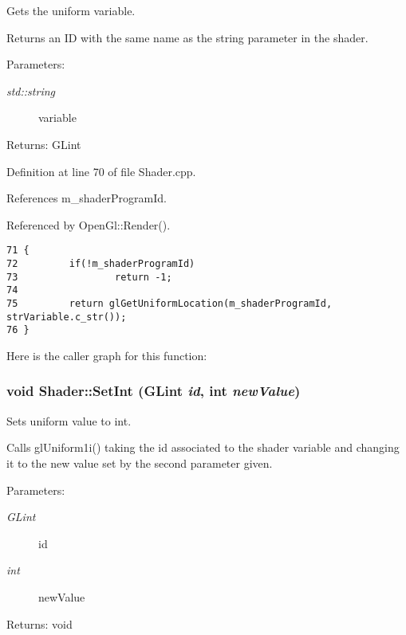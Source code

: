 Gets the uniform variable. 

Returns an ID with the same name as the string parameter in the shader.

\begin{Desc}
\item[Parameters:]
\begin{description}
\item[{\em std::string}]variable \end{description}
\end{Desc}
\begin{Desc}
\item[Returns:]GLint \end{Desc}


Definition at line 70 of file Shader.cpp.

References m\_\-shaderProgramId.

Referenced by OpenGl::Render().

\begin{Code}\begin{verbatim}71 {
72         if(!m_shaderProgramId)
73                 return -1;
74 
75         return glGetUniformLocation(m_shaderProgramId, strVariable.c_str());
76 }
\end{verbatim}
\end{Code}




Here is the caller graph for this function:\hypertarget{class_shader_3287589cdac47466a201e2d6702280ee}{
\subsubsection[SetInt]{\setlength{\rightskip}{0pt plus 5cm}void Shader::SetInt (GLint {\em id}, \/  int {\em newValue})}}
\label{class_shader_3287589cdac47466a201e2d6702280ee}


Sets uniform value to int. 

Calls glUniform1i() taking the id associated to the shader variable and changing it to the new value set by the second parameter given.

\begin{Desc}
\item[Parameters:]
\begin{description}
\item[{\em GLint}]id \item[{\em int}]newValue \end{description}
\end{Desc}
\begin{Desc}
\item[Returns:]void \end{Desc}


